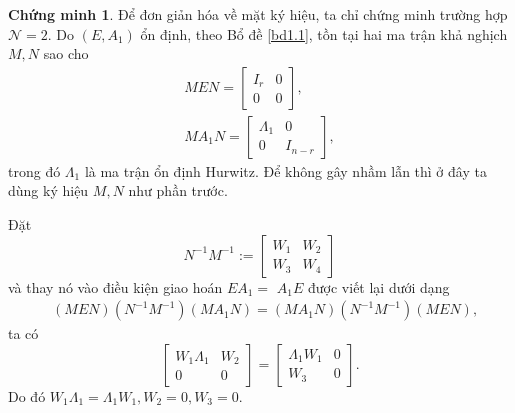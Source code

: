 \documentclass[12pt,a4paper]{report}
\theoremstyle{definition}
\newtheorem*{cv}{Chứng minh}
\theoremstyle{definition}
\numberwithin{dl}{chapter}
\numberwithin{vd}{chapter}
\numberwithin{corollary}{chapter}
\numberwithin{lemma}{chapter}
\numberwithin{md}{chapter}
\numberwithin{dn}{chapter}
\numberwithin{cy}{chapter}
\numberwithin{nx}{chapter}
\begin{document}
\begin{cv} Để đơn giản hóa về mặt ký hiệu, ta chỉ chứng minh trường hợp  $\mathcal{N}=2$. Do $\left(E, A_{1}\right)$ ổn định, theo Bổ đề \ref{bd1.1}, tồn tại hai ma trận khả nghịch $M, N$ sao cho
\begin{equation}\label{2.32}
\begin{gathered}
M E N=\left[\begin{array}{cc}
I_{r} & 0 \\
0 & 0
\end{array}\right], \\
M A_{1} N=\left[\begin{array}{cc}
\Lambda_{1} & 0 \\
0 & I_{n-r}
\end{array}\right],
\end{gathered} 
\end{equation}
trong đó $\Lambda_{1}$ là ma trận ổn định Hurwitz. Để không gây nhầm lẫn thì ở đây ta dùng ký hiệu  $M, N$ như phần trước.

Đặt
\begin{equation}\label{2.33}
N^{-1} M^{-1}:=\left[\begin{array}{ll}
W_{1} & W_{2} \\
W_{3} & W_{4}
\end{array}\right] 
\end{equation}
và thay nó vào điều kiện giao hoán $E A_{1}=$ $A_{1} E$ được viết lại dưới dạng
\begin{equation}\label{2.34}
\begin{aligned}
&(M E N)\left(N^{-1} M^{-1}\right)\left(M A_{1} N\right) =\left(M A_{1} N\right)\left(N^{-1} M^{-1}\right)(M E N),
\end{aligned} 
\end{equation}
ta có
\begin{equation}\label{2.35}
\left[\begin{array}{cc}
W_{1} \Lambda_{1} & W_{2} \\
0 & 0
\end{array}\right]=\left[\begin{array}{cc}
\Lambda_{1} W_{1} & 0 \\
W_{3} & 0
\end{array}\right].
\end{equation}
Do đó $W_{1} \Lambda_{1}=\Lambda_{1} W_{1}, W_{2}=0, W_{3}=0$.


\end{cv}
\end{document}
